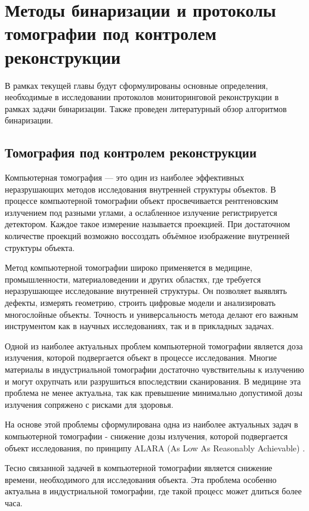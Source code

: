\section{Методы бинаризации и протоколы томографии под контролем реконструкции}

В рамках текущей главы будут сформулированы основные определения, необходимые в исследовании протоколов мониторинговой реконструкции в рамках задачи бинаризации. Также проведен литературный обзор алгоритмов бинаризации.

\subsection{Томография под контролем реконструкции}

Компьютерная томография — это один из наиболее эффективных неразрушающих методов исследования внутренней структуры объектов.  В процессе компьютерной томографии объект просвечивается рентгеновским излучением под разными углами, а ослабленное излучение регистрируется детектором. Каждое такое измерение называется проекцией. При достаточном количестве проекций возможно воссоздать объёмное изображение внутренней структуры объекта.

Метод компьютерной томографии широко применяется в медицине, промышленности, материаловедении и других областях, где требуется неразрушающее исследование внутренней структуры. Он позволяет выявлять дефекты, измерять геометрию, строить цифровые модели и анализировать многослойные объекты. Точность и универсальность метода делают его важным инструментом как в научных исследованиях, так и в прикладных задачах.

Одной из наиболее актуальных проблем компьютерной томографии является доза излучения, которой подвергается объект в процессе исследования. Многие материалы в индустриальной томографии достаточно чувствительны к излучению и могут охрупчать или разрушиться впоследствии сканирования. В медицине эта проблема не менее актуальна, так как превышение минимально допустимой дозы излучения сопряжено с рисками для здоровья.

На основе этой проблемы сформулирована одна из наиболее актуальных задач в компьютерной томографии - снижение дозы излучения, которой подвергается объект исследования, по принципу ALARA (As Low As Reasonably Achievable) \cite{slovis2002alara}.

Тесно связанной задачей в компьютерной томографии является снижение времени, необходимого для исследования объекта. Эта проблема особенно актуальна в индустриальной томографии, где такой процесс может длиться более часа.

